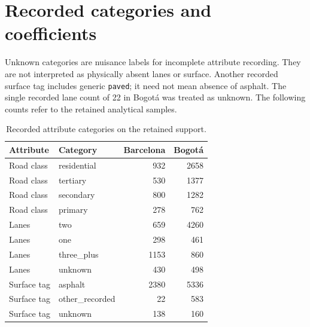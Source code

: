 \documentclass[11pt]{article}
\begin{document}
\section{Recorded categories and coefficients}
Unknown categories are nuisance labels for incomplete attribute recording. They are not interpreted as physically absent lanes or surface. Another recorded surface tag includes generic \texttt{paved}; it need not mean absence of asphalt. The single recorded lane count of 22 in Bogot\'a was treated as unknown. The following counts refer to the retained analytical samples.
\begin{table}[!htbp]\centering\small
\caption{Recorded attribute categories on the retained support.}
\begin{tabular}{llrr}\toprule Attribute & Category & Barcelona & Bogot\'a\\\midrule
Road class & residential & 932 & 2658 \\
Road class & tertiary & 530 & 1377 \\
Road class & secondary & 800 & 1282 \\
Road class & primary & 278 & 762 \\
Lanes & two & 659 & 4260 \\
Lanes & one & 298 & 461 \\
Lanes & three\_plus & 1153 & 860 \\
Lanes & unknown & 430 & 498 \\
Surface tag & asphalt & 2380 & 5336 \\
Surface tag & other\_recorded & 22 & 583 \\
Surface tag & unknown & 138 & 160 \\
\bottomrule\end{tabular}\end{table}
\FloatBarrier
\end{document}
